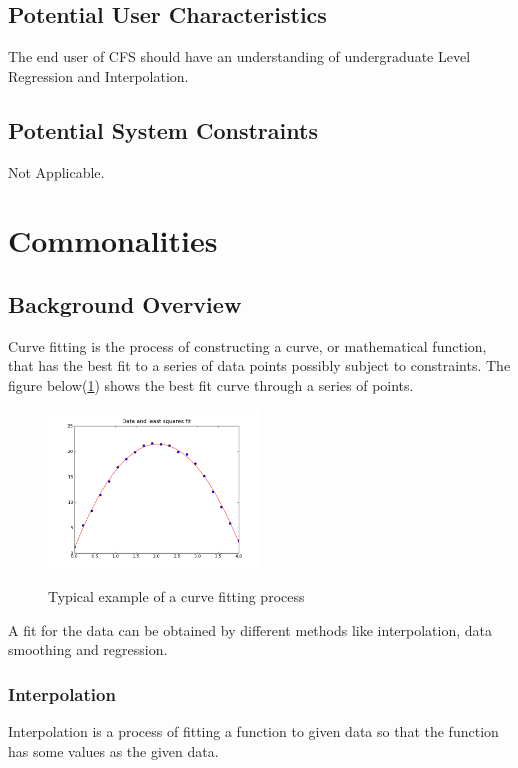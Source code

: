 \documentclass[12pt]{article}
\newcommand{\famname}{CFS} %
\begin{document}
\subsection{Potential User Characteristics} \label{SecUserCharacteristics}

The end user of \famname{} should have an understanding of undergraduate Level Regression and Interpolation.

\subsection{Potential System Constraints}

Not Applicable.

\section{Commonalities}

\subsection{Background Overview} \label{Sec_Background}
Curve fitting is the process of constructing a curve, or mathematical function, that has the best fit to a series of data points possibly subject to constraints. The figure below(\ref{Fig_CurveFitEg}) shows the best fit curve through a series of points.
\begin{figure}[h!]
	\begin{center}
		{
			\includegraphics[width=0.5\textwidth]{lstsq11.png}
		}
		\caption{\label{Fig_CurveFitEg} Typical example of a curve fitting process}
	\end{center}
\end{figure}

A fit for the data can be obtained by different methods like interpolation, data smoothing and regression.

\subsubsection{Interpolation}
Interpolation is a process of fitting a function to given data so that the function has some values as the given data.
\end{document}
